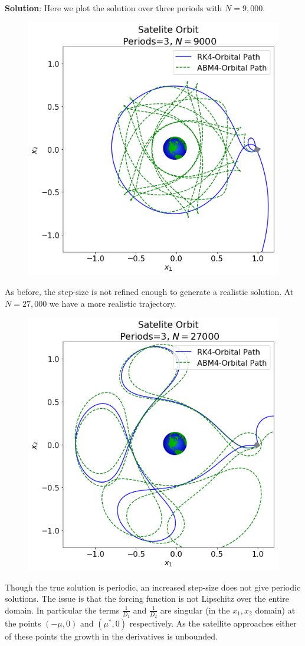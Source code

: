 \documentclass[final,oneside,onecolumn]{article}
\begin{document}
\begin{enumerate}
\begin{enumerate}
\bigbreak
{\large \bf Solution}: Here we plot the solution over three periods with $N=9,000$.
\begin{figure}[H]
	\centering
	\includegraphics[width=.6\linewidth]{hw5_3a_3periods_9ksteps}
\end{figure}
As before, the step-size is not refined enough to generate a realistic solution. At $N=27,000$ we have a more realistic trajectory.
\begin{figure}[H]
	\centering
	\includegraphics[width=.6\linewidth]{hw5_3a_3periods_27ksteps}
\end{figure}
Though the true solution is periodic, an increased step-size does not give periodic solutions. The issue is that the forcing function is not Lipschitz over the entire domain. In particular the terms $\frac{1}{D_1}$ and $\frac{1}{D_2}$ are singular (in the $x_1, x_2$ domain) at the points $(-\mu, 0)$ and $(\mu^*,0)$ respectively. As the satellite approaches either of these points the growth in the derivatives is unbounded. 
\bigbreak


\end{enumerate}
\end{enumerate}
\end{document}
